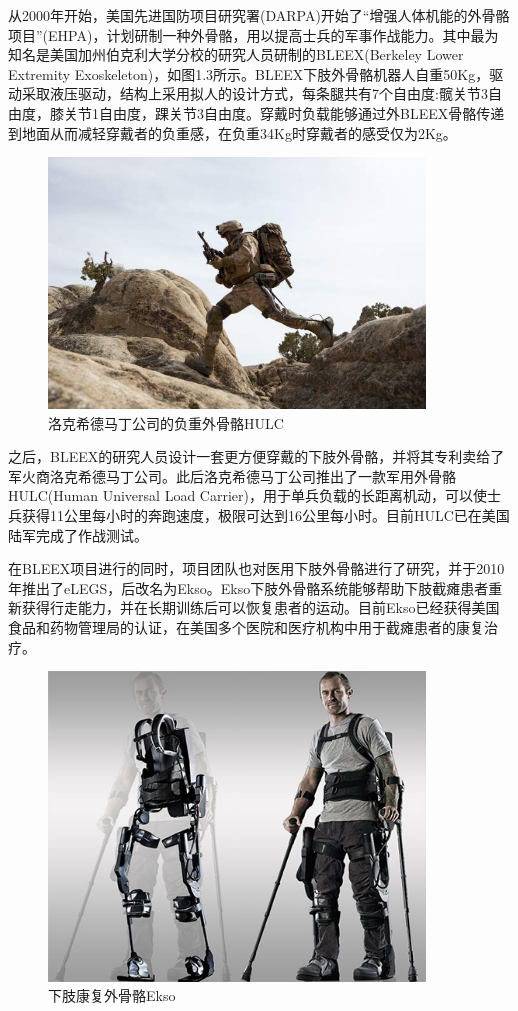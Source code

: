 从2000年开始，美国先进国防项目研究署(DARPA)开始了“增强人体机能的外骨骼项目”(EHPA)，计划研制一种外骨骼，用以提高士兵的军事作战能力。其中最为知名是美国加州伯克利大学分校的研究人员研制的BLEEX\cite{p5,p7}(Berkeley Lower Extremity Exoskeleton)，如图1.3所示。BLEEX下肢外骨骼机器人自重50Kg，驱动采取液压驱动，结构上采用拟人的设计方式，每条腿共有7个自由度:髋关节3自由度，膝关节1自由度，踝关节3自由度。穿戴时负载能够通过外BLEEX骨骼传递到地面从而减轻穿戴者的负重感，在负重34Kg时穿戴者的感受仅为2Kg。
\begin{figure}[!htb]
    \includegraphics[width=10cm]{fig/f5_HULC.jpg}
    \caption{洛克希德马丁公司的负重外骨骼HULC\cite{p10}}
    \label{fig:mark}
\end{figure}

之后，BLEEX的研究人员设计一套更方便穿戴的下肢外骨骼\cite{p10}，并将其专利卖给了军火商洛克希德马丁公司。此后洛克希德马丁公司推出了一款军用外骨骼HULC(Human Universal Load Carrier)，用于单兵负载的长距离机动，可以使士兵获得11公里每小时的奔跑速度，极限可达到16公里每小时。目前HULC已在美国陆军完成了作战测试。

在BLEEX项目进行的同时，项目团队也对医用下肢外骨骼进行了研究，并于2010年推出了eLEGS\cite{p9}，后改名为Ekso。Ekso下肢外骨骼系统能够帮助下肢截瘫患者重新获得行走能力，并在长期训练后可以恢复患者的运动。目前Ekso已经获得美国食品和药物管理局的认证，在美国多个医院和医疗机构中用于截瘫患者的康复治疗。
\begin{figure}[!htb]
    \includegraphics[width=10cm]{fig/f9_ekso.jpg}
    \caption{下肢康复外骨骼Ekso\cite{p9}}
    \label{fig:mark}
\end{figure}

